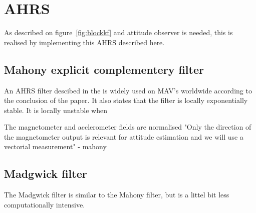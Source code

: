 \chapter{\acl{AHRS}}

\noindent As described on figure~\vref{fig:blockkf} and attitude observer is needed, this is realised by implementing this \ac{AHRS} described here.

\section{Mahony explicit complementery filter}
An \ac{AHRS} filter descibed in the \cite{mahony} is widely used on MAV's worldwide according to the conclusion of the paper. It also states that the filter is locally exponentially stable. It is locally unstable when 


The magnetometer and acclerometer fields are normalised
"Only the direction of the
magnetometer output is relevant for attitude estimation and
we will use a vectorial measurement" - mahony

\section{Madgwick filter}
The Madgwick filter is similar to the Mahony filter, but is a littel bit less computationally intensive. 
